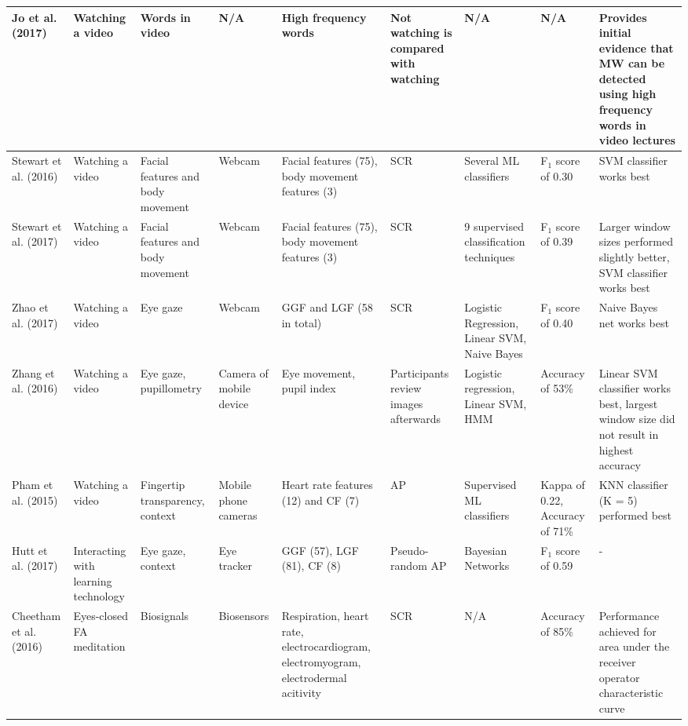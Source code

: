 \begin{ThreePartTable}
\begin{xtabular}{P{20mm}P{28mm}P{26mm}P{30mm}P{29mm}P{23mm}P{33mm}P{24mm}P{46mm}}
                Jo et al. (2017) \cite{Jo2017AMind} & Watching a video & Words in video & N/A & High frequency words & Not watching is compared with watching & N/A & N/A & Provides initial evidence that MW can be detected using high frequency words in video lectures\\ \midrule
                Stewart et al. (2016) \cite{Stewart2016WheresViewing} & Watching a video & Facial features and body movement & Webcam & Facial features (75), body movement features (3) & SCR & Several ML classifiers & F$_1$ score of 0.30 & SVM classifier works best\\ \midrule
                Stewart et al. (2017) \cite{Stewart2017FaceComprehension} & Watching a video & Facial features and body movement & Webcam & Facial features (75), body movement features (3) & SCR & 9 supervised classification techniques & F$_1$ score of 0.39 & Larger window sizes performed slightly better, SVM classifier works best\\ \midrule
                Zhao et al. (2017) \cite{Zhao2017ScalableApproach} & Watching a video & Eye gaze & Webcam & GGF and LGF (58 in total) & SCR & Logistic Regression, Linear SVM, Naive Bayes & F$_1$ score of 0.40 & Naive Bayes net works best\\ \midrule
                Zhang et al. (2016) \cite{ISI:000443429900018} & Watching a video & Eye gaze, pupillometry & Camera of mobile device & Eye movement, pupil index & Participants review images afterwards & Logistic regression, Linear SVM, HMM & Accuracy of 53\% & Linear SVM classifier works best, largest window size did not result in highest accuracy\\ \midrule
                Pham et al. (2015) \cite{Pham2015Attentivelearner:Tracking} & Watching a video & Fingertip transparency, context & Mobile phone cameras & Heart rate features (12) and CF (7) & AP & Supervised ML classifiers & Kappa of 0.22, Accuracy of 71\% & KNN classifier (K = 5) performed best\\ \midrule
                Hutt et al. (2017) \cite{Hutt2017OutClassroom} & Interacting with learning technology & Eye gaze, context & Eye tracker & GGF (57), LGF (81), CF (8) & Pseudo-random AP & Bayesian Networks & F$_1$ score of 0.59 & -\\ \midrule
                Cheetham et al. (2016) \cite{Cheetham2016AutomatedApplication} & Eyes-closed FA meditation & Biosignals & Biosensors & Respiration, heart rate, electrocardiogram, electromyogram, electrodermal acitivity & SCR & N/A & Accuracy of 85\% & Performance achieved for area under the receiver operator characteristic curve\\ \midrule

\end{xtabular}
\end{ThreePartTable}
